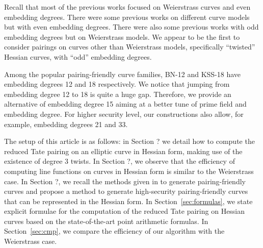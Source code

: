 Recall that most of the previous works focused on Weierstrass curves and even embedding degrees.
There were some previous works on different curve models but with even embedding degrees.
There were also some previous works with odd embedding degrees but on Weierstrass models.
We appear to be the first to consider pairings on curves other than Weierstrass models,
specifically ``twisted'' Hessian curves, with ``odd'' embedding degrees.

Among the popular pairing-friendly curve families,
BN-12 and KSS-18 have embedding degrees 12 and 18 respectively.
We notice that jumping from embedding degree 12 to 18 is quite a huge gap.
Therefore, we provide an alternative of embedding degree 15 aiming at a better tune of prime field and embedding degree.
For higher security level, our constructions also allow, for example, embedding degrees 21 and 33.

The setup of this article is as follows:
in Section ? we detail how to compute the reduced Tate pairing on an elliptic curve in Hessian form, making use of the existence of degree 3 twists.
In Section ?, we observe that the efficiency of computing line functions on curves in Hessian form is similar to the Weierstrass case.
In Section ?, we recall the methods given in \cite{2010/freeman} to generate pairing-friendly curves
and propose a method to generate high-security pairing-friendly curves
that can be represented in the Hessian form.
In Section~\ref{sec:formulas}, we state explicit formulae for the computation of the reduced Tate pairing on Hessian curves based on the state-of-the-art point arithmetic formulas.
In Section~\ref{sec:cmp}, we compare the efficiency of our algorithm with the Weierstrass case.


